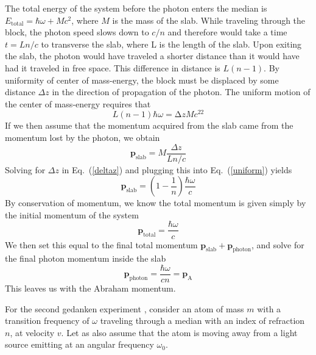 The total energy of the system before the photon enters the median is $E_{\mathrm{total}} = \hbar\omega +Mc^2$, where $M$ is the mass of the slab. While traveling through the block, the photon speed slows down to $c/n$ and therefore would take a time $t = Ln/c$ to transverse the slab, where L is the length of the slab. Upon exiting the slab, the photon would have traveled a shorter distance than it would have had it traveled in free space. This difference in distance is $L(n-1)$. By uniformity of center of mass-energy, the block must be displaced by some distance $\Delta z$ in the direction of propagation of the photon. The uniform motion of the center of mass-energy requires that
\begin{equation}
L(n-1)\hbar\omega = ∆zMc^22
\label{deltaz}
\end{equation}
If we then assume that the momentum acquired from the slab came from the momentum lost by the photon, we obtain
\begin{equation}
\mathbf{p}_{\mathrm{slab}}=M\frac{\Delta z}{Ln/c}
\label{uniform}
\end{equation}
Solving for $\Delta z$ in Eq.\ (\ref{deltaz}) and plugging this into Eq.\ (\ref{uniform}) yields
\begin{equation}
\mathbf{p}_{\mathrm{slab}}=\left(1-\frac{1}{n}\right)\frac{\hbar\omega}{c}
\end{equation}
By conservation of momentum, we know the total momentum is given simply by the initial momentum of the system
\begin{equation}
\mathbf{p}_{\mathrm{total}} = \frac{\hbar\omega}{c}
\end{equation}
We then set this equal to the final total momentum $\mathbf{p}_{\mathrm{slab}}+\mathbf{p}_{\mathrm{photon}}$, 
and solve for the final photon momentum inside the slab
\begin{equation}
\mathbf{p}_{\mathrm{photon}}=\frac{\hbar\omega}{cn}=\mathbf{p}_{\mathrm{A}}
\end{equation}
This leaves us with the Abraham momentum.  

For the second gedanken experiment \cite{barnett}, consider an atom of mass $m$ with a transition frequency of $\omega$ traveling through a median with an index of refraction $n$, at velocity $v$. Let as also assume that the atom is moving away from a light source emitting at an angular frequency $\omega_0$. 

